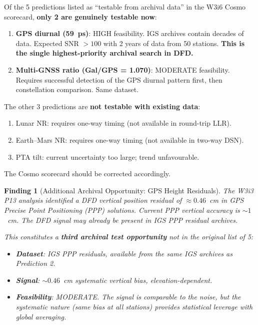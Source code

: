 \documentclass[11pt]{article}
\newtheorem{finding}{Finding}
\begin{document}
\begin{tcolorbox}[colback=red!5!white, colframe=red!60!black,
  title=\textbf{W3i7 Archival Test Correction}]
Of the 5 predictions listed as ``testable from archival data'' in
the W3i6 Cosmo scorecard, \textbf{only 2 are genuinely testable now}:
\begin{enumerate}[nosep]
\item \textbf{GPS diurnal (59~ps)}: HIGH feasibility. IGS archives
  contain decades of data. Expected SNR $> 100$ with 2 years of data
  from 50 stations. \textbf{This is the single highest-priority
  archival search in DFD.}
\item \textbf{Multi-GNSS ratio (Gal/GPS = 1.070)}: MODERATE feasibility.
  Requires successful detection of the GPS diurnal pattern first, then
  constellation comparison. Same dataset.
\end{enumerate}

The other 3 predictions are \textbf{not testable with existing data}:
\begin{enumerate}[nosep]
\item Lunar NR: requires one-way timing (not available in round-trip LLR).
\item Earth--Mars NR: requires one-way timing (not available in two-way DSN).
\item PTA tilt: current uncertainty too large; trend unfavourable.
\end{enumerate}

The Cosmo scorecard should be corrected accordingly.
\end{tcolorbox}

\begin{finding}[Additional Archival Opportunity: GPS Height Residuals]
\label{find:GPS-height}
The W3i3 P13 analysis identified a DFD vertical position residual of
$\approx 0.46$~cm in GPS Precise Point Positioning (PPP) solutions.
Current PPP vertical accuracy is $\sim 1$~cm. The DFD signal may
already be present in IGS PPP residual archives.

This constitutes a \textbf{third archival test opportunity} not in
the original list of 5:
\begin{itemize}[nosep]
\item \textbf{Dataset}: IGS PPP residuals, available from the same
  IGS archives as Prediction 2.
\item \textbf{Signal}: $\sim 0.46$~cm systematic vertical bias,
  elevation-dependent.
\item \textbf{Feasibility}: MODERATE. The signal is comparable to
  the noise, but the systematic nature (same bias at all stations)
  provides statistical leverage with global averaging.
\end{itemize}
\end{finding}
\end{document}
